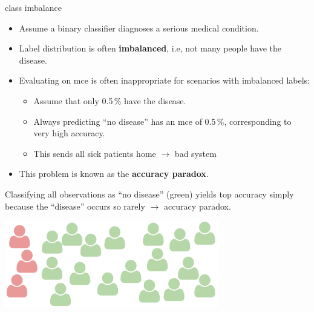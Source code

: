 \documentclass[11pt,compress,t,notes=noshow, xcolor=table]{beamer}
\begin{document}
\begin{vbframe}{class imbalance}

\begin{itemize}
 \item Assume a binary classifier diagnoses a serious medical 
 condition.
 \item Label distribution is often \textbf{imbalanced}, i.e, not many 
 people have the disease.
 \item Evaluating on mce is often inappropriate for scenarios with 
 imbalanced labels:
 \begin{itemize}
   \item Assume that only 0.5\,\% have the disease.
   \item Always predicting \enquote{no disease} has an mce of 0.5\,\%, 
   corresponding to very high accuracy.
   \item This sends all sick patients home $\rightarrow$ bad system %
 \end{itemize}
 \item This problem is known as the \textbf{accuracy paradox}.
\end{itemize}

\framebreak

Classifying all observations as \enquote{no disease} (green) yields top 
accuracy simply because the \enquote{disease} occurs so rarely 
$\rightarrow$ accuracy paradox.

\lz

\begin{center}
  \includegraphics[width=0.7\textwidth]{figure_man/imbalanced.pdf}
\end{center}

\end{vbframe}
 
\end{document}
